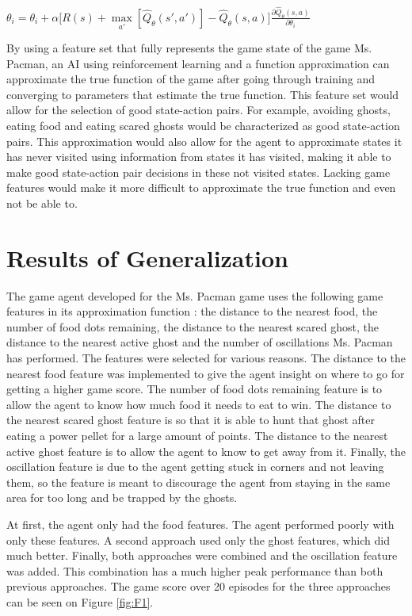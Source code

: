\documentclass[11pt]{scrartcl}
\begin{document}
\begin{center}
$\theta_i = \theta_i + \alpha \Big[R(s) + \underset{a'}{\max} [\hat{Q}_\theta (s',a')] - \hat{Q}_\theta (s,a)\Big] \frac{\partial \hat{Q}_\theta (s,a)}{\partial \theta_i}$
\end{center}

By using a feature set that fully represents the game state of the game Ms. Pacman, an AI using reinforcement learning and a function approximation can approximate the true function of the game after going through training and converging to parameters that estimate the true function. This feature set would allow for the selection of good state-action pairs. For example, avoiding ghosts, eating food and eating scared ghosts would be characterized as good state-action pairs. This approximation would also allow for the agent to approximate states it has never visited using information from states it has visited, making it able to make good state-action pair decisions in these not visited states. Lacking game features would make it more difficult to approximate the true function and even not be able to.

\section{Results of Generalization}

The game agent developed for the Ms. Pacman game uses the following game features in its approximation function : the distance to the nearest food, the number of food dots remaining, the distance to the nearest scared ghost, the distance to the nearest active ghost and the number of oscillations Ms. Pacman has performed. The features were selected for various reasons. The distance to the nearest food feature was implemented to give the agent insight on where to go for getting a higher game score. The number of food dots remaining feature is to allow the agent to know how much food it needs to eat to win. The distance to the nearest scared ghost feature is so that it is able to hunt that ghost after eating a power pellet for a large amount of points. The distance to the nearest active ghost feature is to allow the agent to know to get away from it. Finally, the oscillation feature is due to the agent getting stuck in corners and not leaving them, so the feature is meant to discourage the agent from staying in the same area for too long and be trapped by the ghosts.

At first, the agent only had the food features. The agent performed poorly with only these features. A second approach used only the ghost features, which did much better. Finally, both approaches were combined and the oscillation feature was added. This combination has a much higher peak performance than both previous approaches. The game score over 20 episodes for the three approaches can be seen on Figure \ref{fig:F1}.
\end{document}
